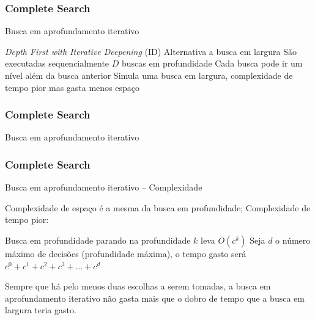 \begin{frame}
\frametitle{Complete Search}
\begin{block}{Busca em aprofundamento iterativo}
\begin{itemize}	\bitem \emph{Depth First with Iterative Deepening} (ID)
	\bitem Alternativa a busca em largura
	\bitem São executadas sequencialmente $D$ buscas em profundidade
	\bitem Cada busca pode ir um nível além da busca anterior
	\bitem Simula uma busca em largura, complexidade de tempo pior mas gasta menos espaço
\end{itemize}
\end{block}
\end{frame}

\begin{frame}
\frametitle{Complete Search}
\begin{block}{Busca em aprofundamento iterativo}
\end{block}
\end{frame}

\begin{frame}
\frametitle{Complete Search}
\begin{block}{Busca em aprofundamento iterativo -- Complexidade}

\begin{itemize}
	\bitem Complexidade de espaço é a mesma da busca em profundidade;
	\bitem Complexidade de tempo pior:
	\begin{itemize}
		\bitem Busca em profundidade parando na profundidade $k$ leva $O(c^k)$
		\bitem Seja $d$ o número máximo de decisões (profundidade máxima), o tempo gasto será $c^0 + c^1 + c^2 + c^3 + ... + c^d$
	\end{itemize}
	\bitem Sempre que há pelo menos duas escolhas a serem tomadas, a busca em aprofundamento iterativo
	não gasta mais que o dobro de tempo que a busca em largura teria gasto.
\end{itemize}	

\end{block}
\end{frame}

